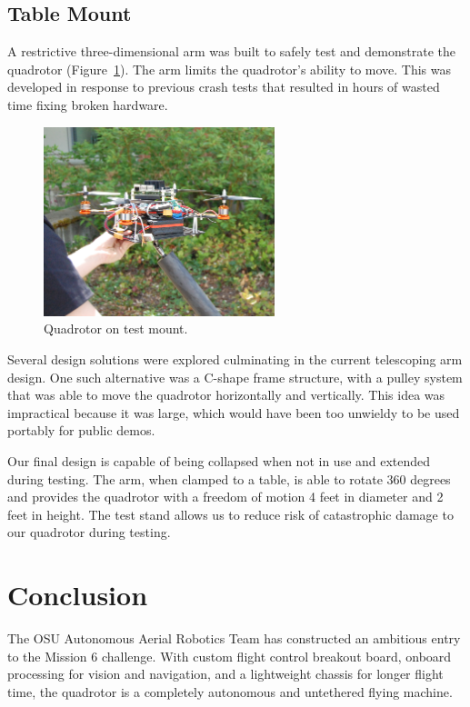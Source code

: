 \documentclass[12pt,letterpaper]{article} \usepackage[margin=1in]{geometry}
\begin{document}
\subsection*{Table Mount}

A restrictive three-dimensional arm was built to safely test and demonstrate
the quadrotor (Figure~\ref{fig:quad_test_mount}). The arm limits the
quadrotor’s ability to move. This was developed in response to previous crash
tests that resulted in hours of wasted time fixing broken hardware.

\begin{figure}[!h]
	\centering
	\includegraphics[width=0.6\textwidth]{img/quad_test_mount.jpg}
	\caption{Quadrotor on test mount.}
	\label{fig:quad_test_mount}
\end{figure}

Several design solutions were explored culminating in the current telescoping
arm design. One such alternative was a C-shape frame structure, with a pulley
system that was able to move the quadrotor horizontally and vertically. This
idea was impractical because it was large, which would have been too unwieldy
to be used portably for public demos.

Our final design is capable of being collapsed when not in use and extended
during testing. The arm, when clamped to a table, is able to rotate 360 degrees
and provides the quadrotor with a freedom of motion 4 feet in diameter and
2 feet in height. The test stand allows us to reduce risk of catastrophic
damage to our quadrotor during testing.



\section*{Conclusion}

The OSU Autonomous Aerial Robotics Team has constructed an ambitious entry to
the Mission 6 challenge. With custom flight control breakout board, onboard
processing for vision and navigation, and a lightweight chassis for longer
flight time, the quadrotor is a completely autonomous and untethered flying
machine.
\end{document}
